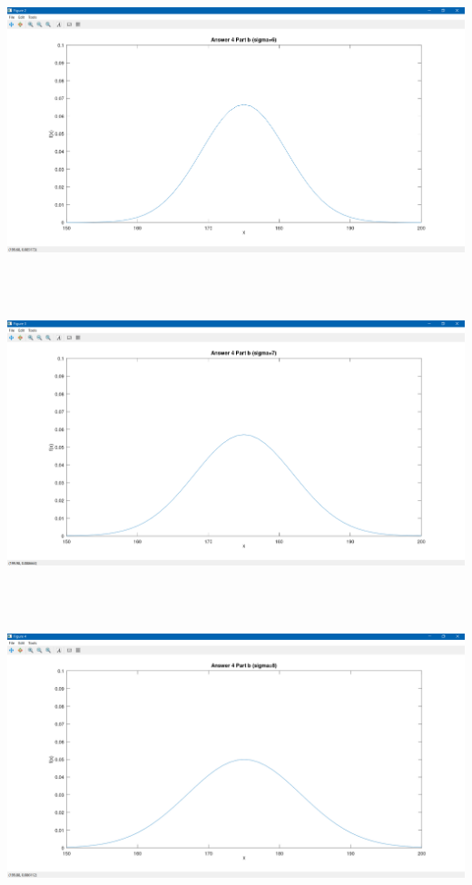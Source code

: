 \documentclass[12pt]{article}
\begin{document}
\includegraphics[width=16cm, height=9cm]{b1.png} \\
\includegraphics[width=16cm, height=9cm]{b2.png} \\
\includegraphics[width=16cm, height=9cm]{b3.png} 
\end{document}
